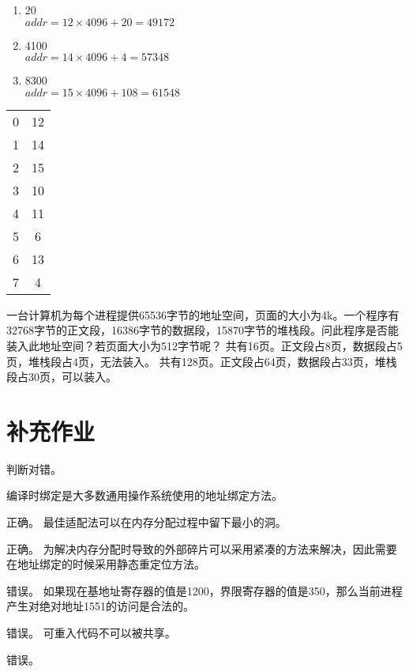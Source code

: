\documentclass{ctexart}
\begin{document}
\begin{outline}[enumerate]
    \begin{minipage}{.8\textwidth}
    \begin{enumerate}
        \item 20\\ 
            $addr = 12 \times 4096 + 20 = 49172$
        \item 4100\\
            $addr = 14 \times 4096 + 4 = 57348$
        \item 8300 \\
            $addr = 15 \times 4096 + 108 = 61548$
    \end{enumerate}
    \end{minipage}
    \begin{minipage}{.2\textwidth}
            \begin{tabular}{c|c|} 
                \cline{2-2}
                0 & 12  \\ 
                \cline{2-2}
                1 & 14  \\ 
                \cline{2-2}
                2 & 15  \\ 
                \cline{2-2}
                3 & 10  \\ 
                \cline{2-2}
                4 & 11  \\ 
                \cline{2-2}
                5 & 6   \\ 
                \cline{2-2}
                6 & 13  \\ 
                \cline{2-2}
                7 & 4   \\
                \cline{2-2}
            \end{tabular}
    \end{minipage}
    
    \1 一台计算机为每个进程提供65536字节的地址空间，页面的大小为4k。一个程序有32768字节的正文段，16386字节的数据段，15870字节的堆栈段。问此程序是否能装入此地址空间？若页面大小为512字节呢？
        \2 共有16页。正文段占8页，数据段占5页，堆栈段占4页，无法装入。
        \2 共有128页。正文段占64页，数据段占33页，堆栈段占30页，可以装入。
\end{outline}

\section*{补充作业}
判断对错。
\begin{outline}
    \1 编译时绑定是大多数通用操作系统使用的地址绑定方法。

        正确。
    \1 最佳适配法可以在内存分配过程中留下最小的洞。

        正确。
    \1 为解决内存分配时导致的外部碎片可以采用紧凑的方法来解决，因此需要在地址绑定的时候采用静态重定位方法。

        错误。
    \1 如果现在基地址寄存器的值是1200，界限寄存器的值是350，那么当前进程产生对绝对地址1551的访问是合法的。

        错误。
    \1 可重入代码不可以被共享。

        错误。

\end{outline}
\end{document}
